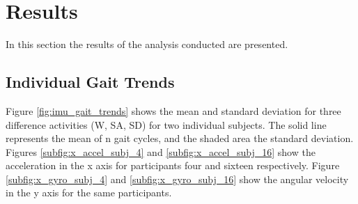\documentclass[sensors,article,submit,moreauthors,pdftex]{Definitions/mdpi}
\begin{document}
\section{Results}
In this section the results of the analysis conducted are presented.

\subsection{Individual Gait Trends}
Figure \ref{fig:imu_gait_trends} shows the mean and standard deviation for three difference activities (W, SA, SD) for two individual subjects. The solid line represents the mean of n gait cycles, and the shaded area the standard deviation. Figures \ref{subfig:x_accel_subj_4} and \ref{subfig:x_accel_subj_16} show the acceleration in the x axis for participants four and sixteen respectively. Figure \ref{subfig:x_gyro_subj_4} and \ref{subfig:x_gyro_subj_16} show the angular velocity in the y axis for the same participants.
\end{document}

